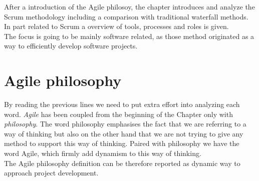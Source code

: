 \documentclass[../main.tex]{subfiles}
\begin{document}
After a introduction of the Agile philosoy, the chapter introduces and analyze the Scrum methodology including a comparison with traditional waterfall methods. In part related to Scrum a overview of tools, processes and roles is given.\\
The focus is going to be mainly software related, as those method originated as a way to efficiently develop software projects.
\section{Agile philosophy}
By reading the previous lines we need to put extra effort into analyzing each word. 
\textit{Agile} has been coupled from the beginning of the Chapter only with \textit{philosophy}.  
The word philosophy emphasises the fact that we are referring to a way of thinking but also on the other hand that we are not trying to give any method to support this way of thinking. Paired with philosophy we have the word Agile, which firmly add dynamism to this way of thinking.\\ 
The Agile philosophy definition can be therefore reported as dynamic way to approach project development.
\end{document}
